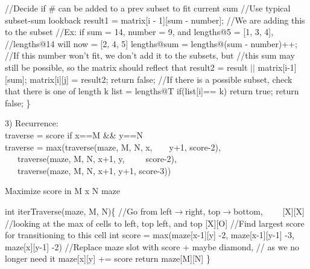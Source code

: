 \documentclass[12pt]{article}
\begin{document}

\begin{algorithm}                     
\begin{algorithmic} [1]

\State 
\State //Decide if \# can be added to a prev subset to fit current sum
\State //Use typical subset-sum lookback
\State result1 = matrix[i - 1][sum - number];
\State
{}
\State //We are adding this to the subset
\State //Ex: if sum = 14, number = 9, and lengths@5 = [1, 3, 4],
\State //lengths@14 will now = [2, 4, 5]
\State lengths@sum = lengths@(sum - number)++;
\EndIf
\State
\State //If this number won't fit, we don't add it to the subsets, but
\State //this sum may still be possible, so the matrix should reflect that
\State result2 = result $||$ matrix[i-1][sum];
\State 
\State matrix[i][j] = result2;
\EndFor
\EndFor
\State
\State
{}
\State return false;
\EndIf
\State
\State //If there is a possible subset, check that there is one of length k
\State list = lengths@T
\State
{}
\State if(list[i]== k) return true;
\EndFor
\State return false;
\State\}
\end{algorithmic}
\end{algorithm}


\pagebreak


3) Recurrence:\\
traverse = score if x==M \&\& y==N\\
traverse = max(traverse(maze, M, N, x,\ \ \ \ y+1, score-2),\\
\indent \indent \indent \indent \ \ \ traverse(maze, M, N, x+1, y,\ \ \ \ \ score-2),\\
\indent \indent \indent \indent \ \ \ traverse(maze, M, N, x+1, y+1, score-3))\\



\begin{algorithm}[H]
\caption{Maximize score in M x N maze}
\begin{algorithmic} [1]
\State int iterTraverse(maze, M, N)\{
\State 
\State //Go from left$\to$right, top$\to$bottom, \indent \indent \indent \ \ \ \ [X][X]
\State //looking at the max of cells to left, top left, and top  [X][O]
\State 
{}
\State //Find largest score for transitioning to this cell
\State int score = max(maze[x-1][y] -2, maze[x-1][y-1] -3, maze[x][y-1] -2)
\State 
\State //Replace maze slot with score + maybe diamond, 
\State // as we no longer need it
\State maze[x][y] += score
\EndFor
\EndFor
\State 
\State return maze[M][N]
\State \}
\end{algorithmic}
\end{algorithm}

\end{document}

